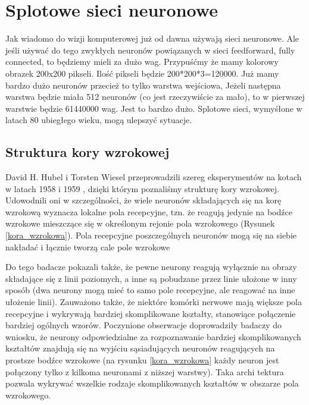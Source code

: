 \documentclass{article}
\begin{document}
\section{Splotowe sieci neuronowe}
Jak wiadomo do wizji komputerowej już od dawna używają sieci neuronowe. Ale jeśli używać do tego zwykłych neuronów powiązanych w sieci feedforward, fully connected, to będziemy mieli za dużo wag. Przypuśćmy że mamy kolorowy obrazek 200x200 pikseli. Ilość pikseli będzie 200*200*3=120000. Już mamy bardzo dużo neuronów przecież to tylko warstwa wejściowa, Jeżeli następna warstwa będzie miała 512 neuronów (co jest rzeczywiście za mało), to w pierwszej warstwie będzie 61440000 wag. Jest to bardzo dużo. 
Splotowe sieci, wymyśłone w latach 80 ubiegłego wieku, mogą ulepszyć sytuacje.

\subsection{Struktura kory wzrokowej}
David H. Hubel i Torsten Wiesel przeprowadzili szereg eksperymentów na kotach w latach 1958 \cite{David_1958} i 1959 \cite{David_1959}, dzięki którym poznaliśmy strukturę kory wzrokowej. Udowodnili oni w szczególności, że wiele neuronów składających się na korę wzrokową wyznacza lokalne pola recepcyjne, tzn. że reagują jedynie na bodźce wzrokowe mieszczące się w określonym rejonie pola wzrokowego (Rysunek \ref{kora_wzrokowa}). Pola recepcyjne poszczególnych neuronów mogą się na siebie nakładać i łącznie tworzą cale pole wzrokowe \cite{geron}

Do tego badacze pokazali także, że pewne neurony reagują wyłącznie na obrazy składające się z linii poziomych, a inne są pobudzane przez linie ułożone w inny sposób (dwa neurony mogą mieć to samo pole recepcyjne, ale reagować na inne ułożenie linii). Zauważono także, że niektóre komórki nerwowe mają większe pola recepcyjne i wykrywają bardziej skomplikowane kształty, stanowiące połączenie bardziej ogólnych wzorów. Poczynione obserwacje doprowadziły badaczy do wniosku, że neurony odpowiedzialne za rozpoznawanie bardziej skomplikowanych kształtów znajdują się na wyjściu sąsiadujących neuronów reagujących na prostsze bodźce wzrokowe (na rysunku \ref{kora_wzrokowa} każdy neuron jest połączony tylko z kilkoma neuronami z niższej warstwy). Taka archi tektura pozwala wykrywać wszelkie rodzaje skomplikowanych kształtów w obszarze pola wzrokowego. \cite{geron}
\end{document}
